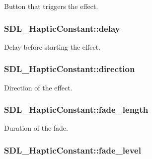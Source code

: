Button that triggers the effect. \hypertarget{struct_s_d_l___haptic_constant_a16a751009893f5412201e3ce91146b25}{
\subsubsection[{delay}]{ S\-D\-L\-\_\-\-Haptic\-Constant\-::delay}}\label{struct_s_d_l___haptic_constant_a16a751009893f5412201e3ce91146b25}
Delay before starting the effect. \hypertarget{struct_s_d_l___haptic_constant_a3e871debf4e57c35960f019d2605d84f}{
\subsubsection[{direction}]{ S\-D\-L\-\_\-\-Haptic\-Constant\-::direction}}\label{struct_s_d_l___haptic_constant_a3e871debf4e57c35960f019d2605d84f}
Direction of the effect. \hypertarget{struct_s_d_l___haptic_constant_a647a6b761ac6ba16160d0892a12806bc}{
\subsubsection[{fade\-\_\-length}]{ S\-D\-L\-\_\-\-Haptic\-Constant\-::fade\-\_\-length}}\label{struct_s_d_l___haptic_constant_a647a6b761ac6ba16160d0892a12806bc}
Duration of the fade. \hypertarget{struct_s_d_l___haptic_constant_a49f6499c89f3e494efbe92f12277c949}{
\subsubsection[{fade\-\_\-level}]{ S\-D\-L\-\_\-\-Haptic\-Constant\-::fade\-\_\-level}}\label{struct_s_d_l___haptic_constant_a49f6499c89f3e494efbe92f12277c949}
